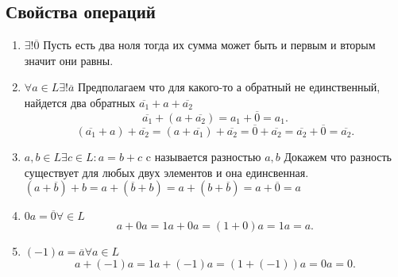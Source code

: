 \documentclass{scrartcl}
\begin{document}
    \subsection{Свойства операций}
    \begin{enumerate}
        \item $\exists ! \overline{0}$
            Пусть есть два ноля тогда их сумма может быть и первым и вторым значит они равны.
        \item $\forall  a\in L \exists ! \overline{a}$
             Предполагаем что для какого-то а обратный не единственный, найдется два обратных $\overline{a_1} + a + \overline{a_2}$
             \[
             \overline{a_1} + (a + \overline{a_2}) = a_1 + \overline{0} = a_1
             .\] 
             \[
                 (\overline{a_1} + a) + \overline{a_2} = (a + \overline{a_1}) + \overline{a_{2}} = \overline{0} + \overline{a_2} = \overline{a_2} + \overline{0} = \overline{a_2}
             .\] 
            \item $a , b \in L \exists  c \in L : a  = b + c$ c называется разностью $a,b$
                Докажем что разность существует для любых двух элементов и она единсвенная.
                $(a + \overline{b}) + b = a + (\overline{b} + b) = a + (b + \overline{b}) = a + \overline{0} = a$
            \item $0a = \overline{0} \forall \in L$
                \[
                a + 0a = 1a + 0a = (1 + 0)a = 1a = a
                .\] 
            \item $(-1)a = \overline{a} \forall  a\in L$
                \[
                a + (-1)a = 1a + (-1)a = (1 + (-1))a = 0a = 0
                .\] 
    \end{enumerate}
\end{document}
